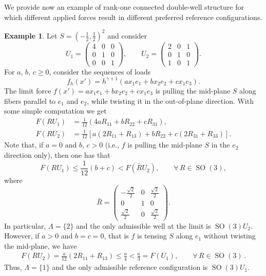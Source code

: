 \documentclass{article}
\theoremstyle{plain}
\theoremstyle{plain}
\theoremstyle{plain}
\theoremstyle{plain}
\theoremstyle{plain}
\theoremstyle{definition}
\theoremstyle{definition}
\newtheorem{example}[teo]{Example}
\DeclareMathOperator{\SO}{SO}
\begin{document}
We provide now an example of rank-one connected double-well structure for which different applied forces result in different preferred reference configurations.
\begin{example}
    Let $ S = (-\frac{1}{2},\frac{1}{2})^{2} $ and consider 
    \begin{equation}
        U_{1} = \begin{pmatrix}
            4 & 0 & 0 \\
            0 & 1 & 0\\
            0 & 0 & 1
        \end{pmatrix}, \qquad U_{2} = \begin{pmatrix}
            2 & 0 & 1\\
            0 & 1 & 0\\
            1 & 0 & 1
        \end{pmatrix}.
    \end{equation}
    For $ a $, $ b $, $ c \geq 0 $, consider the sequences of loads
    \begin{equation}
        f_{h}(x') = h^{\gamma + 1} (a x_{1}e_{1} + b x_{2} e_{2} + c x_{1}e_{3}).
    \end{equation}
    The limit force $ f(x') = ax_{1}e_{1} + bx_{2}e_{2} + cx_{1} e_{3} $ is pulling the mid-plane $ S $ along fibers parallel to $ e_{1} $ and $ e_{2} $, while twisting it in the out-of-plane direction.
    With some simple computation we get
    \begin{align}
        F(RU_{1}) & = \frac{1}{12}(4a R_{11} + bR_{22} + cR_{31}),\\
        F(RU_{2}) & = \frac{1}{12}[a(2R_{11} +  R_{13}) + bR_{22} + c(2R_{31} + R_{33})]. 
    \end{align}
    Note that, if $ a = 0 $ and $ b $, $ c > 0 $ (i.e., $ f $ is pulling the mid-plane $ S $ in the $ e_{2} $ direction only), then one has that 
    \begin{equation}
        F(RU_{1}) \leq \frac{1}{12}(b + c) < F(\bar R U_{2}) , \qquad \forall \, R \in \SO(3),
    \end{equation}
    where
    \begin{equation}
        \bar R = \begin{pmatrix}
            -\frac{\sqrt{2} }{2} & 0 & \frac{\sqrt{2}}{2}\\
            0 & 1 & 0\\
            \frac{\sqrt{2}}{2} & 0 & \frac{\sqrt{2}}{2}
        \end{pmatrix}.
    \end{equation}
    In particular, $ \Lambda = \{2\} $ and the only admissible well at the limit is $ \SO(3)U_{2} $.
    However, if $ a > 0 $ and $ b = c = 0 $, that is $ f $ is tensing $ S $ along $ e_{1} $ without twisting the mid-plane, we have
    \begin{align}
        F(RU_{2}) = \frac{a}{12}(2R_{11} + R_{13}) \leq \frac{a}{4} < \frac{a}{3} = F(U_{1}) , \qquad \forall \, R \in \SO(3) \,. 
    \end{align}
    Thus, $ \Lambda = \{1\} $ and the only admissible reference configuration is $ \SO(3)U_{1} $.
\end{example}
\end{document}
